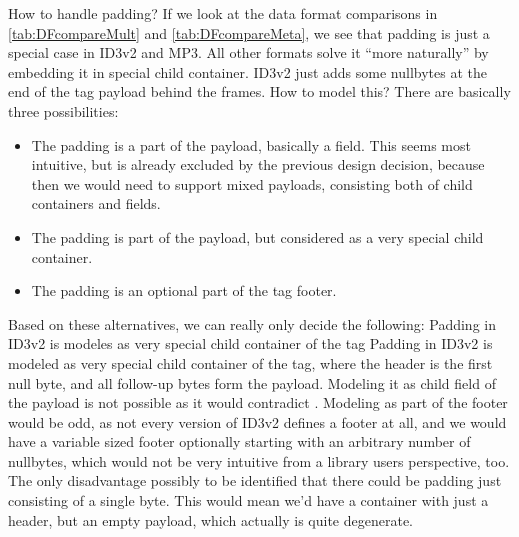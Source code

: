 How to handle padding? If we look at the data format comparisons in \ref{tab:DFcompareMult} and \ref{tab:DFcompareMeta}, we see that padding is just a special case in ID3v2 and MP3. All other formats solve it ``more naturally'' by embedding it in special child container. ID3v2 just adds some nullbytes at the end of the tag payload behind the frames. How to model this? There are basically three possibilities:
\begin{itemize}
\item The padding is a part of the payload, basically a field. This seems most intuitive, but is already excluded by the previous design decision, because then we would need to support mixed payloads, consisting both of child containers and fields.
\item The padding is part of the payload, but considered as a very special child container.
\item The padding is an optional part of the tag footer.
\end{itemize}

Based on these alternatives, we can really only decide the following:
{%
Padding in ID3v2 is modeles as very special child container of the tag
}
{%
Padding in ID3v2 is modeled as very special child container of the tag, where the header is the first null byte, and all follow-up bytes form the payload. 
}
{%
Modeling it as child field of the payload is not possible as it would contradict . Modeling as part of the footer would be odd, as not every version of ID3v2 defines a footer at all, and we would have a variable sized footer optionally starting with an arbitrary number of nullbytes, which would not be very intuitive from a library users perspective, too.
}
{%
The only disadvantage possibly to be identified that there could be padding just consisting of a single byte. This would mean we'd have a container with just a header, but an empty payload, which actually is quite degenerate.
}


%
%
